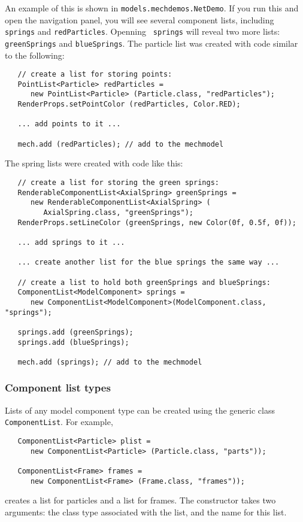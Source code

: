 \documentclass{article}
\begin{document}
An example of this is shown in {\tt models.mechdemos.NetDemo}.  If you
run this and open the navigation panel, you will see several component
lists, including {\tt springs} and {\tt redParticles}. Openning {\tt
springs} will reveal two more lists: {\tt greenSprings} and
{\tt blueSprings}. The particle list was created with code
similar to the following:
\begin{lstlisting}
   // create a list for storing points:
   PointList<Particle> redParticles =
      new PointList<Particle> (Particle.class, "redParticles");
   RenderProps.setPointColor (redParticles, Color.RED);

   ... add points to it ...
  
   mech.add (redParticles); // add to the mechmodel
\end{lstlisting}
The spring lists were created with code like this:
\begin{lstlisting}
   // create a list for storing the green springs:
   RenderableComponentList<AxialSpring> greenSprings =
      new RenderableComponentList<AxialSpring> (
         AxialSpring.class, "greenSprings");
   RenderProps.setLineColor (greenSprings, new Color(0f, 0.5f, 0f));

   ... add springs to it ...

   ... create another list for the blue springs the same way ...

   // create a list to hold both greenSprings and blueSprings:
   ComponentList<ModelComponent> springs =
      new ComponentList<ModelComponent>(ModelComponent.class, "springs");

   springs.add (greenSprings);
   springs.add (blueSprings);
  
   mech.add (springs); // add to the mechmodel
\end{lstlisting}

\subsubsection*{Component list types}

Lists of any model component type can be created using the
generic class {\tt ComponentList}. For example,
\begin{lstlisting}
   ComponentList<Particle> plist = 
      new ComponentList<Particle> (Particle.class, "parts"));

   ComponentList<Frame> frames = 
      new ComponentList<Frame> (Frame.class, "frames"));
\end{lstlisting}
creates a list for particles and a list for frames. The constructor
takes two arguments: the class type associated with the list, and
the name for this list.
\end{document}
